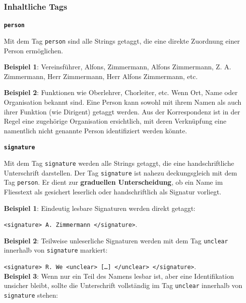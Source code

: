 \documentclass[12pt, a4paper, ngerman, bidi=default]{article}
\newcommand{\code}[1]{\colorbox{VeryLightGray}{\texttt{#1}}} %
\begin{document}
    \subsubsection{Inhaltliche Tags}
    \begin{description}
    \item\texttt{\textbf{{\colorbox{person}{person}}}}
        
    Mit dem Tag \texttt{\colorbox{person}{person}} sind alle Strings getaggt, die eine direkte Zuordnung einer Person ermöglichen.
    
    \noindent \textbf{ Beispiel 1}: Vereinsführer, Alfons, Zimmermann, Alfons Zimmermann, Z. A. Zimmermann, Herr Zimmermann, Herr Alfons Zimmermann, etc. 

    \textbf{ Beispiel 2}: Funktionen wie Oberlehrer, Chorleiter, etc.
    Wenn Ort, Name oder Organisation bekannt sind. Eine Person kann sowohl mit ihrem Namen als auch ihrer Funktion (wie Dirigent) getaggt werden.  
    Aus der Korrespondenz ist in der Regel eine zugehörige Organisation ersichtlich, mit deren Verknüpfung eine namentlich nicht genannte Person identifiziert werden könnte.

    
    \item\texttt{\textbf{{\colorbox{signature}{signature}}}}
        
    Mit dem Tag \texttt{\colorbox{signature}{signature}} werden alle Strings getaggt, die eine handschriftliche Unterschrift darstellen.  
    Der Tag \texttt{\colorbox{signature}{signature}} ist nahezu deckungsgleich mit dem Tag \texttt{\colorbox{person}{person}}.  
    Er dient zur \textbf{graduellen Unterscheidung}, ob ein Name im Fliesstext als gesichert leserlich oder handschriftlich als Signatur vorliegt.  
    
    \noindent \textbf{ Beispiel 1}: Eindeutig lesbare Signaturen werden direkt getaggt:  

    \code{<signature>~A. Zimmermann~</signature>}. 

    \textbf{ Beispiel 2}: Teilweise unleserliche Signaturen werden mit dem Tag \texttt{\colorbox{unclear}{unclear}} innerhalb von \texttt{\colorbox{signature}{signature}} markiert: 

    \code{<signature>~R. We~<unclear>~[\ldots]~</unclear>~</signature>}. \\
    
    \textbf{ Beispiel 3}: Wenn nur ein Teil des Namens lesbar ist, aber eine Identifikation unsicher bleibt, sollte die Unterschrift vollständig im Tag \texttt{\colorbox{unclear}{unclear}} innerhalb von \texttt{\colorbox{signature}{signature}} stehen:\\


\end{description}
\end{document}
